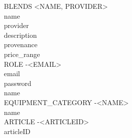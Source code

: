 BLENDS <NAME, PROVIDER>\\
name\\
provider\\
description\\
provenance\\
price\_range\\


ROLE -<EMAIL>\\
email\\
password\\
name\\


EQUIPMENT\_CATEGORY -<NAME>\\
name\\


ARTICLE -<ARTICLEID>\\
articleID\\
\newpage